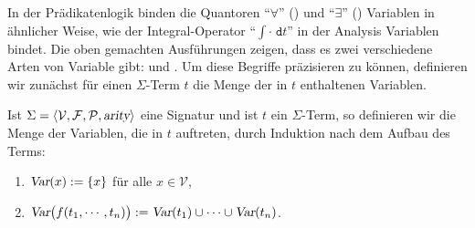 In der Prädikatenlogik binden die Quantoren ``$\forall$'' () und ``$\exists$''
() Variablen in ähnlicher Weise,  wie der Integral-Operator ``$\int \cdot\; \mathtt{d}t$'' in
der Analysis Variablen bindet.  Die oben gemachten Ausführungen zeigen, dass es zwei verschiedene Arten von 
Variable gibt:  und .
Um diese Begriffe präzisieren zu können, definieren wir zunächst für einen
$\Sigma$-Term $t$ die Menge der in $t$ enthaltenen Variablen.

\begin{Definition}[$\var(t)$]
  Ist $\Sigma = \langle \mathcal{V}, \mathcal{F}, \mathcal{P}, \textsl{arity} \rangle$ eine Signatur und ist
  $t$ ein $\Sigma$-Term, so definieren wir die Menge  der Variablen, die in $t$
    auftreten, durch Induktion nach dem Aufbau des Terms:
    \begin{enumerate}
    \item $\textsl{Var}(x) := \{ x \}$ \quad für alle $x \in \mathcal{V}$,
    \item $\textsl{Var}\bigl(f(t_1,\cdots,t_n)\bigr) := \textsl{Var}(t_1) \cup \cdots \cup \textsl{Var}(t_n)$.
          \eox
    \end{enumerate}
\end{Definition}


